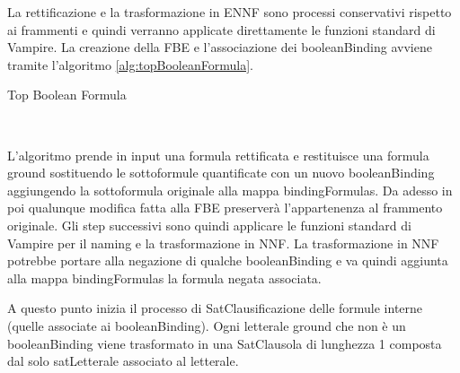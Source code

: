 \documentclass[./main.tex]{subfiles}
\begin{document}
La rettificazione e la trasformazione in ENNF sono processi conservativi rispetto ai frammenti e quindi verranno applicate 
direttamente le funzioni standard di Vampire.
La creazione della FBE e l'associazione dei booleanBinding avviene tramite l'algoritmo \ref{alg:topBooleanFormula}.

\begin{algorithm}[H] \label{alg:topBooleanFormula}
    \caption{Top Boolean Formula}
    \\
\end{algorithm}

L'algoritmo prende in input una formula rettificata e restituisce una formula ground sostituendo le sottoformule quantificate con 
un nuovo booleanBinding aggiungendo la sottoformula originale alla mappa bindingFormulas.
Da adesso in poi qualunque modifica fatta alla FBE preserverà l'appartenenza al frammento originale.
Gli step successivi sono quindi applicare le funzioni standard di Vampire per il naming e la trasformazione in NNF.
La trasformazione in NNF potrebbe portare alla negazione di qualche booleanBinding
e va quindi aggiunta alla mappa bindingFormulas la formula negata associata.


A questo punto inizia il processo di SatClausificazione delle formule interne (quelle associate ai booleanBinding).
Ogni letterale ground che non è un booleanBinding viene trasformato in una 
SatClausola di lunghezza 1 composta dal solo satLetterale associato al letterale.
\end{document}
